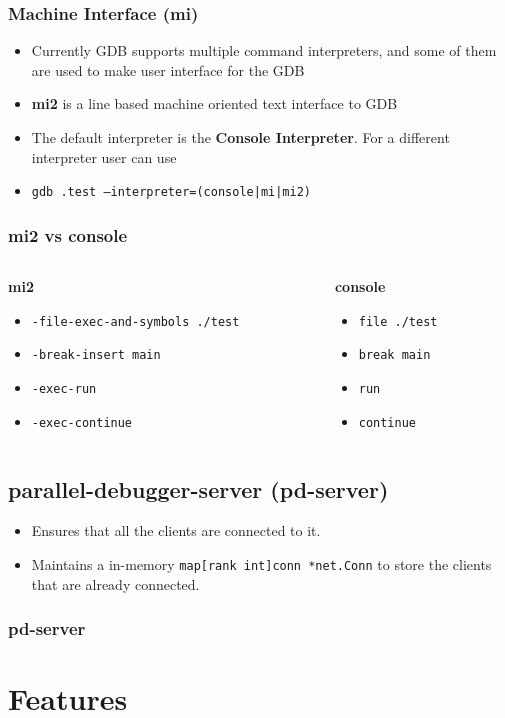 \documentclass{beamer}
\begin{document}
\begin{frame}
  \frametitle{Machine Interface (mi)}
  \begin{itemize}
  \item <1-> {Currently GDB supports multiple command interpreters, and
      some of them are used to make user interface for the GDB}
  \item <2-> {\textbf{mi2} is a line based machine oriented text interface to
    GDB}
\item <3-> {The default interpreter is the \textbf{Console Interpreter}. For
   a different interpreter user can use}
\item <3-> {\texttt{gdb .test --interpreter=(console|mi|mi2)}}
\end{itemize}
\end{frame}

\begin{frame}
  \frametitle{mi2 vs console}
  \begin{columns}
      \begin{column}{0.5\textwidth}
        \begin{center}
          \textbf{mi2}
          \end{center}
    \begin{itemize}
      \item <1-> \texttt{-file-exec-and-symbols ./test}
      \item <2-> \texttt{-break-insert main}
      \item <3-> \texttt{-exec-run}
      \item <4-> \texttt{-exec-continue}
      \end{itemize}
    \end{column}
    \begin{column}{0.5\textwidth}
      \begin{center}
        \textbf{console}
      \end{center}
      \begin{itemize}
      \item <1-> \texttt{file ./test}
      \item <2-> \texttt{break main}
      \item <3-> \texttt{run}
      \item <4-> \texttt{continue}
      \end{itemize}
    \end{column}
  \end{columns}
\end{frame}

\subsection{parallel-debugger-server (pd-server)}

\begin{frame}
  \begin{itemize}
  \item <1-> Ensures that all the clients are connected to it.
  \item <2-> Maintains a in-memory \texttt{map[rank int]conn *net.Conn} to store the clients that are already
    connected. 
  \end{itemize}
  \frametitle{pd-server}
\end{frame}
\section{Features}
\end{document}
